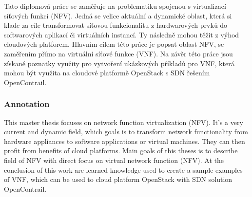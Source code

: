 \documentclass[a4paper,czech,czech,openright,cleardoubleempty,BCOR10mm,DIV11]{scrreprt}
\begin{document}
Tato diplomová práce se zaměřuje na problematiku spojenou s virtualizací síťových funkcí (NFV). Jedná se velice aktuální a dynamické oblast, která si klade za cíle transformovat síťovou funkcionalitu z hardwarových prvků do softwarových aplikací či virtuálních instancí. Ty následně mohou těžit z výhod cloudových platforem.
Hlavním cílem této práce je popsat oblast NFV, se zaměřením přímo na virtuální síťové funkce (VNF). Na závěr této práce jsou získané poznatky využity pro vytvoření ukázkových příkladů pro VNF, která mohou být využita na cloudové platformě OpenStack s SDN řešením OpenContrail.

\subsubsection*{Annotation}

This master thesis focuses on network function virtualization (NFV). It’s a very current and dynamic field, which goals is to transform network functionality from hardware appliances to software applications or virtual machines. They can then profit from benefits of cloud platforms. 
Main goals of this theses is to describe field of NFV with direct focus on virtual network function (NFV). At the conclusion of this work are learned knowledge used to create a sample examples of VNF, which can be used to cloud platform OpenStack with SDN solution OpenContrail.


\cleardoublepage{}

{\small %
}{\small \par}

\cleardoublepage{}\thispagestyle{empty}{\small 

\setcounter{secnumdepth}{4}
\setcounter{tocdepth}{3}%

\tableofcontents{}%
\cleardoublepage{}}{\small \par}










\cleardoublepage{}




\end{document}

